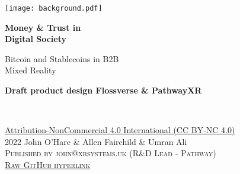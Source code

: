 \documentclass[
	10pt, %
	fleqn, %
	a5paper, %
]{LegrandOrangeBook}
\begin{document}

\titlepage %
	{\texttt{[image: background.pdf]}} %
	{ %
		\centering\sffamily %
		{\Huge\bfseries Money \& Trust in \\Digital Society\par} %
		\vspace{16pt} %
		{\LARGE Bitcoin and Stablecoins in B2B \\Mixed Reality\\}  %
		\vspace{24pt} %
		{\large \textbf{Draft product design Flossverse \& PathwayXR}\par} %
	}


\thispagestyle{empty} %

~\vfill %

\noindent \href{https://creativecommons.org/licenses/by-nc/4.0/}{Attribution-NonCommercial 4.0 International (CC BY-NC 4.0) }\\ 2022 John O'Hare \& Allen Fairchild \& Umran Ali\\ %

\noindent \textsc{Published by john@xrsystems.uk (R\&D Lead - Pathway)}\\ %

\noindent \textsc{\href{https://github.com/flossverse/origin/blob/draft/Book/metaverseBTC.pdf}{Raw GitHub hyperlink}}\\ %
\end{document}
